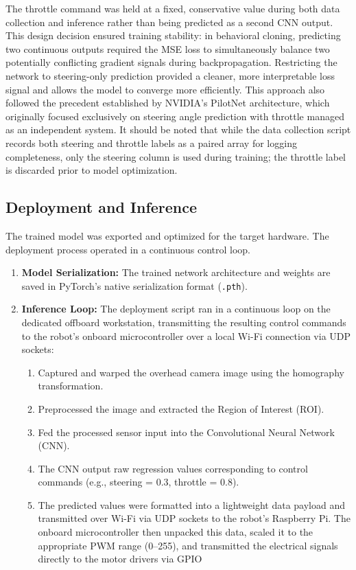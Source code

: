 The throttle command was held at a fixed, conservative value during both data collection
and inference rather than being predicted as a second CNN output. This design decision
ensured training stability: in behavioral cloning, predicting two continuous outputs
required the MSE loss to simultaneously balance two potentially conflicting gradient
signals during backpropagation. Restricting the network to steering-only prediction
provided a cleaner, more interpretable loss signal and allows the model to converge more
efficiently. This approach also followed the precedent established by NVIDIA's PilotNet
architecture, which originally focused exclusively on steering angle prediction with
throttle managed as an independent system. It should be noted that while the data
collection script records both steering and throttle labels as a paired array for logging
completeness, only the steering column is used during training; the throttle label is
discarded prior to model optimization.
\subsection{Deployment and Inference}
\label{sec:deployment_inference}

The trained model was exported and optimized for the target hardware. The deployment process operated in a continuous control loop.

\begin{enumerate}
    \item \textbf{Model Serialization:} The trained network architecture and weights are saved in PyTorch's native serialization format (\texttt{.pth}).

    \item \textbf{Inference Loop:} The deployment script ran in a continuous loop on the dedicated offboard workstation, transmitting the resulting control commands to the robot's onboard microcontroller over a local Wi-Fi connection via UDP sockets:
    \begin{enumerate}[label=\alph*.]
        \item Captured and warped the overhead camera image using the homography transformation.
        \item Preprocessed the image and extracted the Region of Interest (ROI).
        \item Fed the processed sensor input into the Convolutional Neural Network (CNN).
        \item The CNN output raw regression values corresponding to control commands (e.g., steering = 0.3, throttle = 0.8).
        \item The predicted values were formatted into a lightweight data payload and transmitted over Wi-Fi via UDP sockets to the robot's Raspberry Pi. The onboard microcontroller then unpacked this data, scaled it to the appropriate PWM range (0--255), and transmitted the electrical signals directly to the motor drivers via GPIO
    \end{enumerate}
\end{enumerate}

